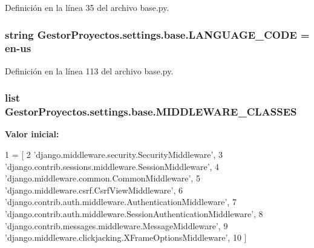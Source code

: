 Definición en la línea 35 del archivo base.\+py.

\subsubsection[{\texorpdfstring{L\+A\+N\+G\+U\+A\+G\+E\+\_\+\+C\+O\+DE}{LANGUAGE_CODE}}]{\setlength{\rightskip}{0pt plus 5cm}string Gestor\+Proyectos.\+settings.\+base.\+L\+A\+N\+G\+U\+A\+G\+E\+\_\+\+C\+O\+DE = \textquotesingle{}en-\/us\textquotesingle{}}\hypertarget{namespace_gestor_proyectos_1_1settings_1_1base_ac34d02e015f26bedb6fada92be8d4e5a}{}\label{namespace_gestor_proyectos_1_1settings_1_1base_ac34d02e015f26bedb6fada92be8d4e5a}


Definición en la línea 113 del archivo base.\+py.

\subsubsection[{\texorpdfstring{M\+I\+D\+D\+L\+E\+W\+A\+R\+E\+\_\+\+C\+L\+A\+S\+S\+ES}{MIDDLEWARE_CLASSES}}]{\setlength{\rightskip}{0pt plus 5cm}list Gestor\+Proyectos.\+settings.\+base.\+M\+I\+D\+D\+L\+E\+W\+A\+R\+E\+\_\+\+C\+L\+A\+S\+S\+ES}\hypertarget{namespace_gestor_proyectos_1_1settings_1_1base_a155e70121919eb32247749de8d67a089}{}\label{namespace_gestor_proyectos_1_1settings_1_1base_a155e70121919eb32247749de8d67a089}
{\bfseries Valor inicial\+:}
\begin{DoxyCode}
1 = [
2     \textcolor{stringliteral}{'django.middleware.security.SecurityMiddleware'},
3     \textcolor{stringliteral}{'django.contrib.sessions.middleware.SessionMiddleware'},
4     \textcolor{stringliteral}{'django.middleware.common.CommonMiddleware'},
5     \textcolor{stringliteral}{'django.middleware.csrf.CsrfViewMiddleware'},
6     \textcolor{stringliteral}{'django.contrib.auth.middleware.AuthenticationMiddleware'},
7     \textcolor{stringliteral}{'django.contrib.auth.middleware.SessionAuthenticationMiddleware'},
8     \textcolor{stringliteral}{'django.contrib.messages.middleware.MessageMiddleware'},
9     \textcolor{stringliteral}{'django.middleware.clickjacking.XFrameOptionsMiddleware'},
10 ]
\end{DoxyCode}


